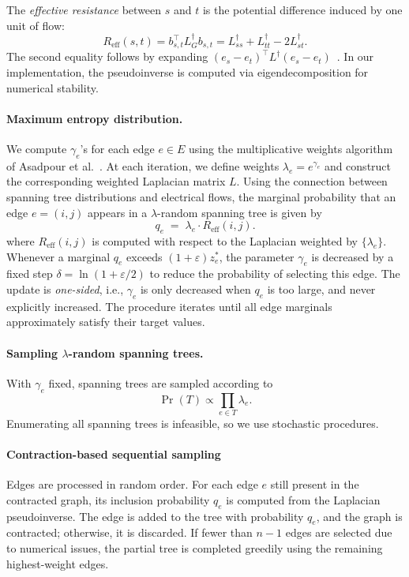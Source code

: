 \documentclass[12pt]{report}
\theoremstyle{definition}
\begin{document}
The \emph{effective resistance} between $s$ and $t$ is the potential difference induced by one unit of flow:
\[
R_{\mathrm{eff}}(s, t) = b_{s,t}^\top L_G^\dagger b_{s,t} = L^\dagger_{ss} + L^\dagger_{tt} - 2 L^\dagger_{st}.
\]
The second equality follows by expanding $(e_s - e_t)^\top L^\dagger (e_s - e_t)$~\cite{ovgharan2015lec4}. In our implementation, the pseudoinverse is computed via eigendecomposition for numerical stability.

\paragraph{Maximum entropy distribution.}
We compute $\gamma_e$'s for each edge $e \in E$ using the multiplicative weights algorithm of Asadpour et al.~\cite{asadpour}. At each iteration, we define weights $\lambda_e = e^{\gamma_e}$ and construct the corresponding weighted Laplacian matrix $L$. Using the connection between spanning tree distributions and electrical flows, the marginal probability that an edge $e = (i,j)$ appears in a $\lambda$-random spanning tree is given by 
\[ 
q_e \;=\; \lambda_e \cdot R_{\mathrm{eff}}(i,j).
\]
where $R_{\mathrm{eff}}(i,j)$ is computed with respect to the Laplacian weighted by $\{\lambda_e\}$. Whenever a marginal $q_e$ exceeds $(1+\varepsilon) z^*_e$, the parameter $\gamma_e$ is decreased by a fixed step \(\delta = \ln(1 + \varepsilon/2)\) to reduce the probability of selecting this edge. The update is \emph{one-sided}, i.e., $\gamma_e$ is only decreased when $q_e$ is too large, and never explicitly increased. The procedure iterates until all edge marginals approximately satisfy their target values.

\paragraph{Sampling $\lambda$-random spanning trees.}  
With $\gamma_e$ fixed, spanning trees are sampled according to
\[
\Pr(T) \propto \prod_{e \in T} \lambda_e.
\]
Enumerating all spanning trees is infeasible, so we use stochastic procedures.

\paragraph{Contraction-based sequential sampling} Edges are processed in random order. For each edge $e$ still present in the contracted graph, its inclusion probability $q_e$ is computed from the Laplacian pseudoinverse. The edge is added to the tree with probability $q_e$, and the graph is contracted; otherwise, it is discarded. If fewer than $n-1$ edges are selected due to numerical issues, the partial tree is completed greedily using the remaining highest-weight edges.
\end{document}
